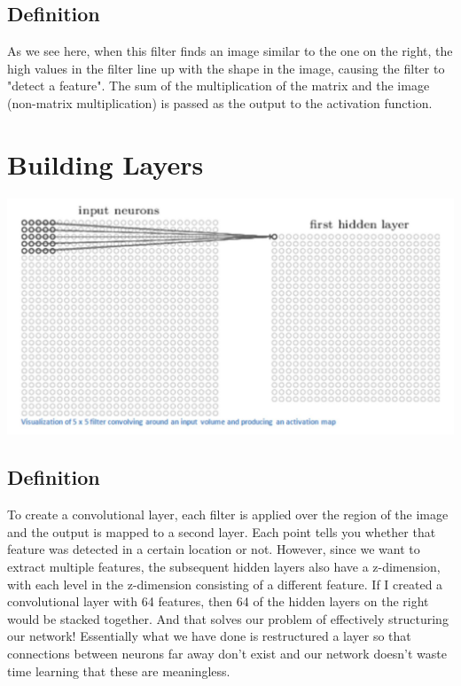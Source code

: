 \documentclass{article}
\begin{document}
\subsection{Definition}
As we see here, when this filter finds an image similar to the one on the right, the high values in the filter line up with the shape in the image, causing the filter to "detect a feature". The sum of the multiplication of the matrix and the image (non-matrix multiplication) is passed as the output to the activation function.

\section{Building Layers}
\begin{center}
\includegraphics[scale=0.5]{Capture}
\end{center}
\subsection{Definition}
To create a convolutional layer, each filter is applied over the region of the image and the output is mapped to a second layer. Each point tells you whether that feature was detected in a certain location or not. However, since we want to extract multiple features, the subsequent hidden layers also have a z-dimension, with each level in the z-dimension consisting of a different feature. If I created a convolutional layer with 64 features, then 64 of the hidden layers on the right would be stacked together. And that solves our problem of effectively structuring our network! Essentially what we have done is restructured a layer so that connections between neurons far away don't exist and our network doesn't waste time learning that these are meaningless.
\end{document}
